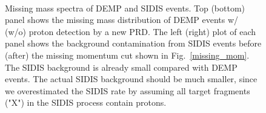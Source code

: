 \begin{figure}[!ht]
 \begin{center}
      \\
   \caption[Missing Mass]{\footnotesize{Missing mass spectra of DEMP and SIDIS events. Top (bottom) panel shows the missing mass distribution of DEMP events w/ (w/o) proton detection by a new PRD. The left (right) plot of each panel shows the background contamination from SIDIS events before (after) the missing momentum cut shown in Fig.~\ref{missing_mom}. The SIDIS background is already small compared with DEMP events. The actual SIDIS background should be much smaller, since we overestimated the SIDIS rate by assuming all target fragments ("X") in the SIDIS process contain protons.}}
  \label{missing_mass}
  \end{center}
\end{figure}

